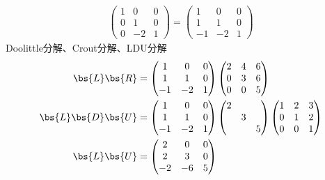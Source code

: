 \documentclass[12pt, a4paper, oneside, UTF8]{ctexbook}
\begin{document}
\begin{solution}
\begin{enumerate}[label=(\arabic*)]
\begin{align*}
                \begin{pmatrix}
                    1& 0 &0\\
                    0&1&0\\
                    0&-2&1
                \end{pmatrix}
                =\begin{pmatrix}
                    1& 0 &0\\
                    1&1&0\\
                    -1&-2&1
                \end{pmatrix}
            \end{align*}
            Doolittle分解、Crout分解、LDU分解
        \begin{align*}
            \bs{L}\bs{R}&=
            \begin{pmatrix}
                1& 0 &0\\
                1&1&0\\
                -1&-2&1
            \end{pmatrix}\begin{pmatrix}
                2 & 4 & 6\\
                0&3&6\\
                0 & 0& 5
            \end{pmatrix}\\
            \bs{L}\bs{D}\bs{U}&=\begin{pmatrix}
                1& 0 &0\\
                1&1&0\\
                -1&-2&1
            \end{pmatrix}
            \begin{pmatrix}
                2 & & \\
                & 3& \\
                & & 5
            \end{pmatrix}
            \begin{pmatrix}
                1 & 2 & 3\\
                0&1&2\\
                0 & 0& 1
            \end{pmatrix}\\
            \bs{L}\bs{U}&=
            \begin{pmatrix}
                2 & 0 & 0\\
                2&3&0\\
                -2 & -6& 5

\end{pmatrix}
\end{align*}
\end{enumerate}
\end{solution}
\end{document}
